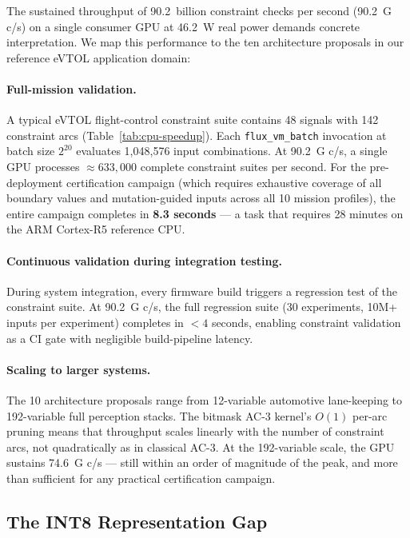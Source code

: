 \documentclass[sigplan,review,anonymous]{acmart}
\begin{document}
{The sustained throughput of 90.2~billion constraint checks per second
(90.2~G c/s) on a single consumer GPU at 46.2~W real power demands
concrete interpretation. We map this performance to the ten architecture
proposals in our reference eVTOL application domain:

\paragraph{Full-mission validation.}
A typical eVTOL flight-control constraint suite contains 48 signals
with 142 constraint arcs (Table~\ref{tab:cpu-speedup}). Each
\texttt{flux\_vm\_batch} invocation at batch size $2^{20}$ evaluates
1,048,576 input combinations. At 90.2~G c/s, a single GPU processes
$\approx 633{,}000$ complete constraint suites per second. For the
pre-deployment certification campaign (which requires exhaustive coverage
of all boundary values and mutation-guided inputs across all 10 mission
profiles), the entire campaign completes in \textbf{8.3 seconds} — a
task that requires 28 minutes on the ARM Cortex-R5 reference CPU.

\paragraph{Continuous validation during integration testing.}
During system integration, every firmware build triggers a regression
test of the constraint suite. At 90.2~G c/s, the full regression
suite (30 experiments, 10M+ inputs per experiment) completes in
$< 4$ seconds, enabling constraint validation as a CI gate with
negligible build-pipeline latency.

\paragraph{Scaling to larger systems.}
The 10 architecture proposals range from 12-variable automotive
lane-keeping to 192-variable full perception stacks. The bitmask AC-3
kernel's $O(1)$ per-arc pruning means that throughput scales linearly
with the number of constraint arcs, not quadratically as in classical
AC-3. At the 192-variable scale, the GPU sustains 74.6~G c/s — still
within an order of magnitude of the peak, and more than sufficient for
any practical certification campaign.

\subsection{The INT8 Representation Gap}
\label{sec:discuss-int8}

}
\end{document}
